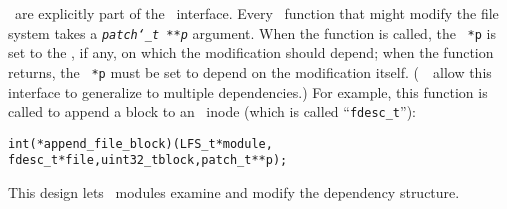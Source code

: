 \Patches\ are explicitly part of the \LFS\ interface.
%
Every \LFS\ function that might modify the file system takes a
\texttt{\textit{patch\char`\_t **p}} argument.
%
When the function is called, the \patch\ \texttt{*p} is set to the \patch, if
any, on which the modification should depend;
%
when the function returns, the \patch\ \texttt{*p} must be set to depend on
the modification itself.
%
(\Noop\ \patches\ allow this interface to generalize to multiple
dependencies.)
%
For example, this function is called to append a block to an \LFS\ inode
(which is called ``\verb+fdesc_t+''):

\begin{small}
\begin{alltt}
int (*append_file_block)(LFS_t *module, 
   fdesc_t *file, uint32_t block, patch_t **p);
\end{alltt}
\end{small}

\noindent%
This design lets \LFS\ modules examine and modify the dependency structure.
